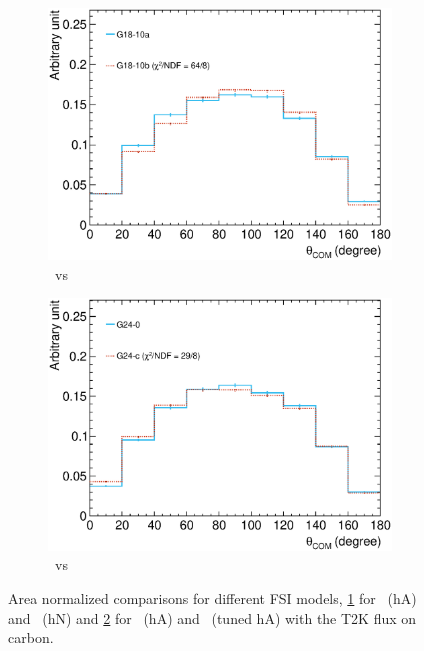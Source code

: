      \begin{figure}
     \begin{subfigure}[b]{\dbfigwid\textwidth}
          \centering
          \includegraphics[width=\textwidth]{figures/COM/anorm-10a10b-lfgdef_da_tan.eps}
          \caption{\geta\ vs \getb\ }
          \label{subfig:10a10b-comp-t2k}
     \end{subfigure}
     \begin{subfigure}[b]{\dbfigwid\textwidth}
          \centering
          \includegraphics[width=\textwidth]{figures/COM/anorm-g240c-t2k-_da_tan.eps}
          \caption{\gZero\ vs \gC}
          \label{subfig:g240c-comp-t2k}
     \end{subfigure}
     \caption{Area normalized comparisons for different FSI models, \ref{subfig:10a10b-comp-t2k} for \geta\ (hA) and \getb\ (hN) and \ref{subfig:g240c-comp-t2k} for \gZero\ (hA) and \gC\ (tuned hA) with the T2K flux on carbon.}
     \label{fig:fsi-comp}
     \end{figure}

